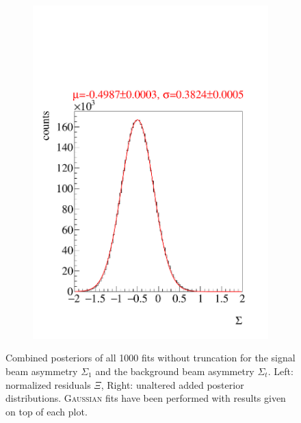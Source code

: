\begin{figure}[htbp]
\begin{subfigure}{\linewidth}
	\includegraphics[width=.49\linewidth]{../bayes/etap_event_based_fit/plots/combined_post_add_notrunc_bkg_raw.pdf}
\end{subfigure}
	\caption{Combined posteriors of all 1000 fits without truncation for the signal beam asymmetry $\Sigma_1$ and the background beam asymmetry $\Sigma_t$. Left: normalized residuals $\Xi$, Right: unaltered added posterior distributions. \textsc{Gaussian} fits have been performed with results given on top of each plot.}
	\label{fig:completpost}
\end{figure}
